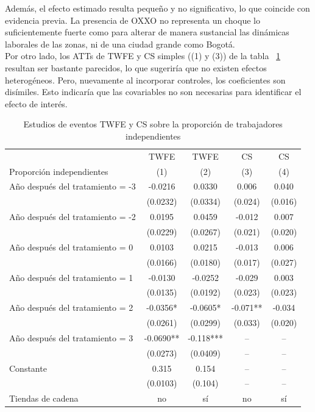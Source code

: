 \documentclass{article}
\begin{document}
Además, el efecto estimado resulta pequeño y no significativo, lo que coincide con evidencia previa. 
La presencia de OXXO no representa un choque lo suficientemente fuerte como para alterar de manera sustancial las dinámicas laborales de las zonas, ni de una ciudad grande como Bogotá. \\

Por otro lado, los ATTs de TWFE y CS simples ((1) y (3)) de la tabla ~\ref{tab:resultados_ES}  resultan ser bastante parecidos, lo que sugeriría que no existen efectos heterogéneos. 
Pero, nuevamente al incorporar controles, los coeficientes son disímiles. Esto indicaría que las covariables no son necesarias para identificar el efecto de interés. \\

\begin{table}[H]
\centering
\caption{Estudios de eventos TWFE y CS sobre la proporción de trabajadores independientes}
\label{tab:resultados_ES}
\begin{tabular}{lcccc}
\hline
\hline
 & TWFE & TWFE & CS & CS \\
Proporción independientes & (1) & (2) & (3) & (4) \\
\hline
Año después del tratamiento = -3 & -0.0216 & 0.0330 & 0.006 & 0.040 \\
 & (0.0232) & (0.0334) & (0.024) & (0.016) \\
Año después del tratamiento = -2 & 0.0195 & 0.0459 & -0.012 & 0.007 \\
 & (0.0229) & (0.0267) & (0.021) & (0.020) \\
Año después del tratamiento = 0 & 0.0103 & 0.0215 & -0.013 & 0.006 \\
 & (0.0166) & (0.0180) & (0.017) & (0.027) \\
Año después del tratamiento = 1 & -0.0130 & -0.0252 & -0.029 & 0.003 \\
 & (0.0135) & (0.0192) & (0.023) & (0.023) \\
Año después del tratamiento = 2 & -0.0356* & -0.0605* & -0.071** & -0.034 \\
 & (0.0261) & (0.0299) & (0.033) & (0.020) \\
Año después del tratamiento = 3 & -0.0690** & -0.118*** & -- & -- \\
 & (0.0273) & (0.0409) & -- & -- \\
Constante & 0.315 & 0.154 & -- & -- \\
 & (0.0103) & (0.104) & -- & -- \\
\hline
Tiendas de cadena & no & sí & no & sí \\

\end{tabular}
\end{table}
\end{document}
